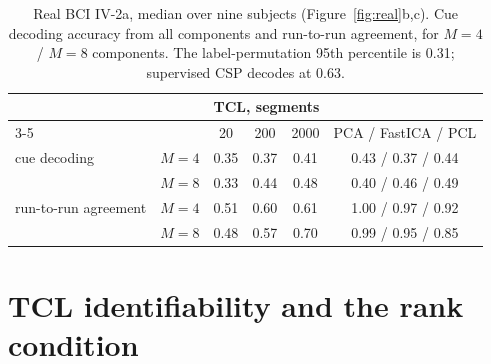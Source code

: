 \begin{table}[h]\centering\small
\caption{Real BCI IV-2a, median over nine subjects (Figure~\ref{fig:real}b,c). Cue decoding accuracy from all components and run-to-run agreement, for $M = 4$ / $M = 8$ components. The label-permutation 95th percentile is 0.31; supervised CSP decodes at 0.63.}
\label{tab:cue}
\begin{tabular}{llcccc}\toprule
 & & \multicolumn{3}{c}{TCL, segments} & \\ \cmidrule(lr){3-5}
 & & 20 & 200 & 2000 & PCA / FastICA / PCL \\ \midrule
cue decoding & $M = 4$ & 0.35 & 0.37 & 0.41 & 0.43 / 0.37 / 0.44 \\
 & $M = 8$ & 0.33 & 0.44 & 0.48 & 0.40 / 0.46 / 0.49 \\
run-to-run agreement & $M = 4$ & 0.51 & 0.60 & 0.61 & 1.00 / 0.97 / 0.92 \\
 & $M = 8$ & 0.48 & 0.57 & 0.70 & 0.99 / 0.95 / 0.85 \\
\bottomrule\end{tabular}\end{table}

\section{TCL identifiability and the rank condition}
\label{app:tcl}

